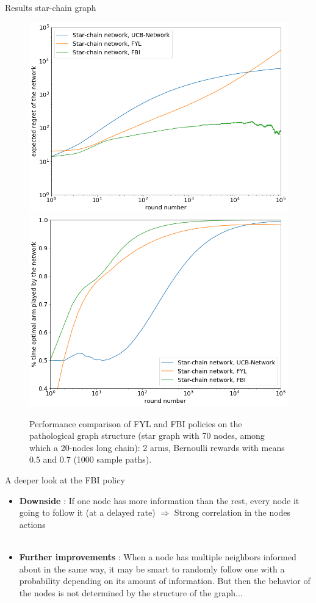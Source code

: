 \documentclass{beamer}
\begin{document}
\begin{frame}{Results star-chain graph}
\begin{figure}[H]
  \centering
  \includegraphics[width=0.49\linewidth]{fig5_1.png}
  \includegraphics[width=0.49\linewidth]{fig5_2.png}
  \caption{\centering Performance comparison of FYL and FBI policies on the pathological graph structure (star graph with 70 nodes, among which a 20-nodes long chain): 2 arms, Bernoulli rewards with means $0.5$ and $0.7$ (1000 sample paths).}
\end{figure}
\end{frame}

\begin{frame}{A deeper look at the FBI policy}
\begin{itemize}
\item \textbf{Downside} : If one node has more information than the rest, every node it going to follow it (at a delayed rate) $\Rightarrow$ \alert{Strong correlation in the nodes actions} \\ ~ \\


\item \textbf{Further improvements} : When a node has multiple neighbors informed about in the same way, it may be smart to randomly follow one with a \alert{probability depending on its amount of information}. But then the behavior of the nodes is not determined by the structure of the graph... 
\end{itemize}
\end{frame}
\end{document}
